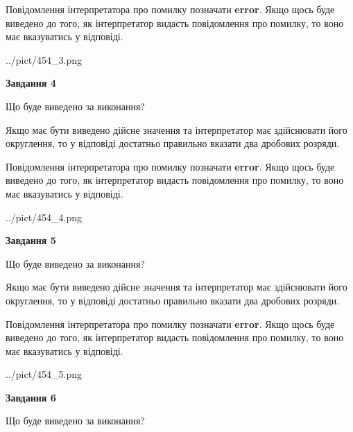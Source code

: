 \documentclass[12pt, ukrainian]{article}
\begin{document}
{\begin {Large}
Повідомлення інтерпретатора про помилку позначати \textbf{error}.
Якщо щось буде виведено до того, як інтерпретатор видасть повідомлення про помилку, 
то воно має вказуватись у відповіді. \par

\begin{center}
	{../pict/454_3.png}
\end{center}
\newpage

{\begin {center}\textbf{Завдання 4}\end {center}}\par
Що буде виведено за виконання? \par

Якщо має бути виведено дійсне значення та інтерпретатор має здійснювати його округлення, 
то у відповіді достатньо правильно вказати два дробових розряди.

Повідомлення інтерпретатора про помилку позначати \textbf{error}.
Якщо щось буде виведено до того, як інтерпретатор видасть повідомлення про помилку, 
то воно має вказуватись у відповіді. \par

\begin{center}
	{../pict/454_4.png}
\end{center}
\newpage

{\begin {center}\textbf{Завдання 5}\end {center}}\par
Що буде виведено за виконання? \par

Якщо має бути виведено дійсне значення та інтерпретатор має здійснювати його округлення, 
то у відповіді достатньо правильно вказати два дробових розряди.

Повідомлення інтерпретатора про помилку позначати \textbf{error}.
Якщо щось буде виведено до того, як інтерпретатор видасть повідомлення про помилку, 
то воно має вказуватись у відповіді. \par

\begin{center}
	{../pict/454_5.png}
\end{center}
\newpage

{\begin {center}\textbf{Завдання 6}\end {center}}\par
Що буде виведено за виконання? \par


\end{Large}}
\end{document}
